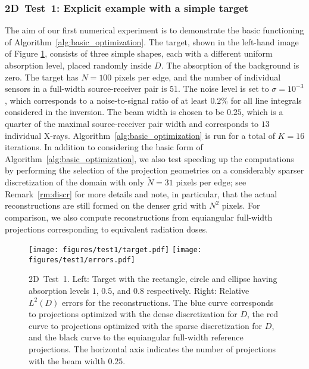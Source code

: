 \documentclass[final]{siamltex}
\begin{document}
\subsubsection{2D~Test~1: Explicit example with a simple target}
The aim of our first numerical experiment is to demonstrate the basic functioning of Algorithm~\ref{alg:basic_optimization}. The target, shown in the left-hand image of Figure \ref{fig:test1phantom}, consists of three simple shapes, each with a different uniform absorption level, placed randomly inside $D$. The absorption of the background is zero. The target has $N = 100$ pixels per edge, and the number of individual sensors in a full-width source-receiver pair is $51$. The noise level is set to $\sigma = 10^{-3}$, which corresponds to a noise-to-signal ratio of at least $0.2$\% for all line integrals considered in the inversion. The beam width is chosen to be $0.25$, which is a quarter of the maximal source-receiver pair width and corresponds to $13$ individual X-rays. Algorithm~\ref{alg:basic_optimization} is run for a total of $K=16$ iterations. In addition to considering the basic form of Algorithm~\ref{alg:basic_optimization}, we also test speeding up the computations by performing the selection of the projection geometries on a considerably sparser discretization of the domain with only $\tilde{N} = 31$ pixels per edge; see Remark~\ref{rm:discr} for more details and note, in particular, that the actual reconstructions are still formed on the denser grid with $N^2$ pixels. For comparison, we also compute reconstructions from equiangular full-width projections corresponding to equivalent radiation doses.

\begin{figure}
	\centering
  \texttt{[image: figures/test1/target.pdf]}
  \texttt{[image: figures/test1/errors.pdf]}
	\caption{{\sc 2D~Test~1.} Left: Target with the rectangle, circle and ellipse having absorption levels $1$, $0.5$, and $0.8$ respectively. Right: Relative $L^2(D)$ errors for the reconstructions. The blue curve corresponds to projections optimized with the dense discretization for $D$, the red curve to projections optimized with the sparse discretization for $D$, and the black curve to the equiangular full-width reference projections. The horizontal axis indicates the number of projections with the beam width $0.25$.}
	\label{fig:test1phantom}
\end{figure}
\end{document}
